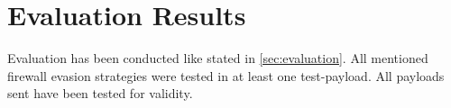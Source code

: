 \section{Evaluation Results}
\label{sec:EvaluationResults}
Evaluation has been conducted like stated in \ref{sec:evaluation}. 
All mentioned firewall evasion strategies were tested in at least one test-payload.
All payloads sent have been tested for validity.

%

